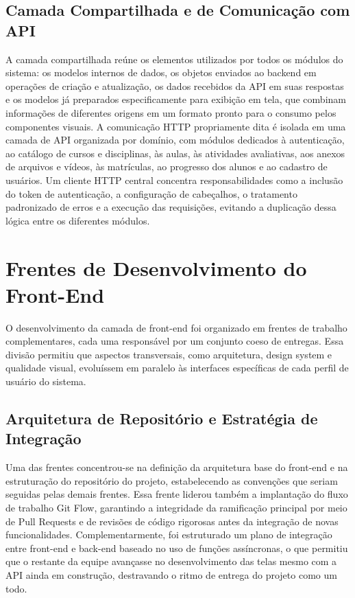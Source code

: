 \documentclass[12pt]{article}
\begin{document}
\subsection{Camada Compartilhada e de Comunicação com API}
A camada compartilhada reúne os elementos utilizados por todos os módulos do sistema: os modelos internos de dados, os objetos enviados ao backend em operações de criação e atualização, os dados recebidos da API em suas respostas e os modelos já preparados especificamente para exibição em tela, que combinam informações de diferentes origens em um formato pronto para o consumo pelos componentes visuais. A comunicação HTTP propriamente dita é isolada em uma camada de API organizada por domínio, com módulos dedicados à autenticação, ao catálogo de cursos e disciplinas, às aulas, às atividades avaliativas, aos anexos de arquivos e vídeos, às matrículas, ao progresso dos alunos e ao cadastro de usuários. Um cliente HTTP central concentra responsabilidades como a inclusão do token de autenticação, a configuração de cabeçalhos, o tratamento padronizado de erros e a execução das requisições, evitando a duplicação dessa lógica entre os diferentes módulos.

\section{Frentes de Desenvolvimento do Front-End}
O desenvolvimento da camada de front-end foi organizado em frentes de trabalho complementares, cada uma responsável por um conjunto coeso de entregas. Essa divisão permitiu que aspectos transversais, como arquitetura, design system e qualidade visual, evoluíssem em paralelo às interfaces específicas de cada perfil de usuário do sistema.

\subsection{Arquitetura de Repositório e Estratégia de Integração}
Uma das frentes concentrou-se na definição da arquitetura base do front-end e na estruturação do repositório do projeto, estabelecendo as convenções que seriam seguidas pelas demais frentes. Essa frente liderou também a implantação do fluxo de trabalho Git Flow, garantindo a integridade da ramificação principal por meio de Pull Requests e de revisões de código rigorosas antes da integração de novas funcionalidades. Complementarmente, foi estruturado um plano de integração entre front-end e back-end baseado no uso de funções assíncronas, o que permitiu que o restante da equipe avançasse no desenvolvimento das telas mesmo com a API ainda em construção, destravando o ritmo de entrega do projeto como um todo.
\end{document}

